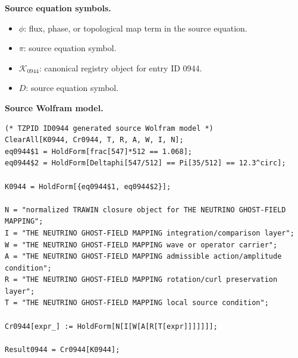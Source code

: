 \begin{minipage}[t]{0.49\linewidth}
\begingroup
\small
\raggedright
\textbf{Source equation symbols.}\par
\begin{itemize}[leftmargin=1.35em,itemsep=1pt,topsep=1pt,parsep=0pt]
    \item $\phi$: flux, phase, or topological map term in the source equation.
    \item $\pi$: source equation symbol.
    \item $\mathcal{K}_{0944}$: canonical registry object for entry ID 0944.
    \item $D$: source equation symbol.
\end{itemize}
\endgroup
\end{minipage}\hfill
\begin{minipage}[t]{0.47\linewidth}
\begingroup
\scriptsize
\raggedright
\textbf{Source Wolfram model.}\par
\begin{Verbatim}[fontsize=\tiny,breaklines=true,breakanywhere=true]
(* TZPID ID0944 generated source Wolfram model *)
ClearAll[K0944, Cr0944, T, R, A, W, I, N];
eq0944$1 = HoldForm[frac[547]*512 == 1.068];
eq0944$2 = HoldForm[Deltaphi[547/512] == Pi[35/512] == 12.3^circ];

K0944 = HoldForm[{eq0944$1, eq0944$2}];

N = "normalized TRAWIN closure object for THE NEUTRINO GHOST-FIELD MAPPING";
I = "THE NEUTRINO GHOST-FIELD MAPPING integration/comparison layer";
W = "THE NEUTRINO GHOST-FIELD MAPPING wave or operator carrier";
A = "THE NEUTRINO GHOST-FIELD MAPPING admissible action/amplitude condition";
R = "THE NEUTRINO GHOST-FIELD MAPPING rotation/curl preservation layer";
T = "THE NEUTRINO GHOST-FIELD MAPPING local source condition";

Cr0944[expr_] := HoldForm[N[I[W[A[R[T[expr]]]]]]];

Result0944 = Cr0944[K0944];
\end{Verbatim}
\endgroup
\end{minipage}

